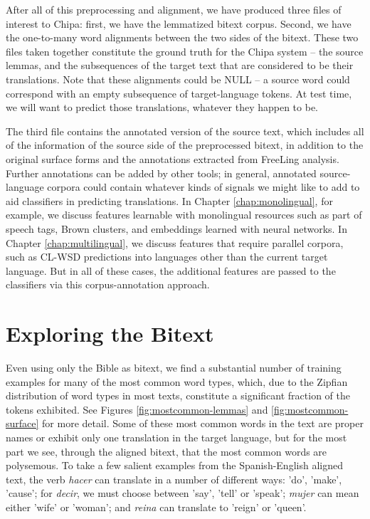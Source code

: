 
After all of this preprocessing and alignment, we have produced three files of
interest to Chipa: first, we have the lemmatized bitext corpus. Second, we have
the one-to-many word alignments between the two sides of the bitext. These two
files taken together constitute the ground truth for the Chipa system -- the
source lemmas, and the subsequences of the target text that are considered to
be their translations. Note that these alignments could be NULL -- a source
word could correspond with an empty subsequence of target-language tokens. At
test time, we will want to predict those translations, whatever they happen to
be.

The third file contains the annotated version of the source text, which
includes all of the information of the source side of the preprocessed bitext,
in addition to the original surface forms and the annotations extracted from
FreeLing analysis. Further annotations can be added by other tools; in general,
annotated source-language corpora could contain whatever kinds of signals we
might like to add to aid classifiers in predicting translations. In Chapter
\ref{chap:monolingual}, for example, we discuss features learnable with
monolingual resources such as part of speech tags, Brown clusters, and
embeddings learned with neural networks. In Chapter \ref{chap:multilingual}, we
discuss features that require parallel corpora, such as CL-WSD predictions into
languages other than the current target language. But in all of these cases,
the additional features are passed to the classifiers via this
corpus-annotation approach.


\section{Exploring the Bitext}
\label{sec:exploring}
Even using only the Bible as bitext, we find a substantial number of
training examples for many of the most common word types, which, due to the
Zipfian distribution of word types in most texts, constitute a significant
fraction of the tokens exhibited. See Figures \ref{fig:mostcommon-lemmas} and
\ref{fig:mostcommon-surface} for more detail.
Some of these most common words
in the text are proper names or exhibit only one translation in the target
language, but for the most part we see, through the aligned bitext, that
the most common words are polysemous.
To take a few salient examples from the Spanish-English aligned text,
the verb \emph{hacer} can translate in a number of different ways: 'do',
'make', 'cause'; for \emph{decir}, we must choose between 'say', 'tell' or
'speak'; \emph{mujer} can mean either 'wife' or 'woman'; and \emph{reina} can
translate to 'reign' or 'queen'.  

